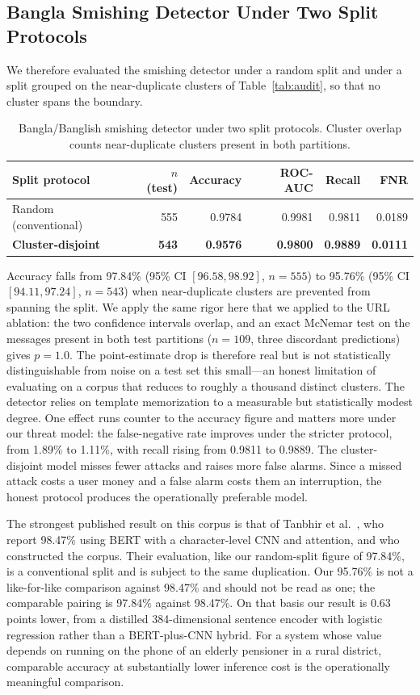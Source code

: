 \documentclass[manuscript,screen,review]{acmart}
\begin{document}
\subsection{Bangla Smishing Detector Under Two Split Protocols}
We therefore evaluated the smishing detector under a random split and under a split grouped on the near-duplicate clusters of Table~\ref{tab:audit}, so that no cluster spans the boundary.

\begin{table}[t]
\centering
\caption{Bangla/Banglish smishing detector under two split protocols. Cluster overlap counts near-duplicate clusters present in both partitions.}
\label{tab:sms}
\small
\begin{tabular}{lrrrrr}
\toprule
Split protocol & $n$ (test) & Accuracy & ROC-AUC & Recall & FNR \\
\midrule
Random (conventional) & 555 & 0.9784 & 0.9981 & 0.9811 & 0.0189 \\
\textbf{Cluster-disjoint} & \textbf{543} & \textbf{0.9576} & \textbf{0.9800} & \textbf{0.9889} & \textbf{0.0111} \\
\bottomrule
\end{tabular}
\end{table}

Accuracy falls from 97.84\% (95\% CI $[96.58, 98.92]$, $n=555$) to 95.76\% (95\% CI $[94.11, 97.24]$, $n=543$) when near-duplicate clusters are prevented from spanning the split. We apply the same rigor here that we applied to the URL ablation: the two confidence intervals overlap, and an exact McNemar test on the messages present in both test partitions ($n=109$, three discordant predictions) gives $p=1.0$. The point-estimate drop is therefore real but is not statistically distinguishable from noise on a test set this small---an honest limitation of evaluating on a corpus that reduces to roughly a thousand distinct clusters. The detector relies on template memorization to a measurable but statistically modest degree. One effect runs counter to the accuracy figure and matters more under our threat model: the false-negative rate improves under the stricter protocol, from 1.89\% to 1.11\%, with recall rising from 0.9811 to 0.9889. The cluster-disjoint model misses fewer attacks and raises more false alarms. Since a missed attack costs a user money and a false alarm costs them an interruption, the honest protocol produces the operationally preferable model.

The strongest published result on this corpus is that of Tanbhir et al.~\cite{tanbhir2024}, who report 98.47\% using BERT with a character-level CNN and attention, and who constructed the corpus. Their evaluation, like our random-split figure of 97.84\%, is a conventional split and is subject to the same duplication. Our 95.76\% is not a like-for-like comparison against 98.47\% and should not be read as one; the comparable pairing is 97.84\% against 98.47\%. On that basis our result is 0.63 points lower, from a distilled 384-dimensional sentence encoder with logistic regression rather than a BERT-plus-CNN hybrid. For a system whose value depends on running on the phone of an elderly pensioner in a rural district, comparable accuracy at substantially lower inference cost is the operationally meaningful comparison.
\end{document}
